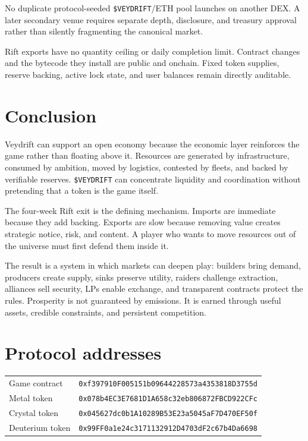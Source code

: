 \documentclass[11pt]{article}
\newcommand{\token}[1]{\texttt{\$#1}}
\newcommand{\address}[1]{{\scriptsize\texttt{#1}}}
\begin{document}
No duplicate protocol-seeded \token{VEYDRIFT}/ETH pool launches on another DEX. A later secondary venue requires separate depth, disclosure, and treasury approval rather than silently fragmenting the canonical market.

Rift exports have no quantity ceiling or daily completion limit. Contract changes and the bytecode they install are public and onchain. Fixed token supplies, reserve backing, active lock state, and user balances remain directly auditable.

\section{Conclusion}

Veydrift can support an open economy because the economic layer reinforces the game rather than floating above it. Resources are generated by infrastructure, consumed by ambition, moved by logistics, contested by fleets, and backed by verifiable reserves. \token{VEYDRIFT} can concentrate liquidity and coordination without pretending that a token is the game itself.

The four-week Rift exit is the defining mechanism. Imports are immediate because they add backing. Exports are slow because removing value creates strategic notice, risk, and content. A player who wants to move resources out of the universe must first defend them inside it.

The result is a system in which markets can deepen play: builders bring demand, producers create supply, sinks preserve utility, raiders challenge extraction, alliances sell security, LPs enable exchange, and transparent contracts protect the rules. Prosperity is not guaranteed by emissions. It is earned through useful assets, credible constraints, and persistent competition.

\section{Protocol addresses}

\begin{tabularx}{\textwidth}{@{}p{}X@{}}
\toprule
Game contract & \address{0xf397910F005151b09644228573a4353818D3755d} \\
Metal token & \address{0x078b4EC3E7681D1A658c32eb806872FBCD922CFc} \\
Crystal token & \address{0x045627dc0b1A10289B53E23a5045aF7D470EF50f} \\
Deuterium token & \address{0x99FF0a1e24c3171132912D4703dF2c67b4Da6698} \\
\bottomrule
\end{tabularx}
\end{document}
